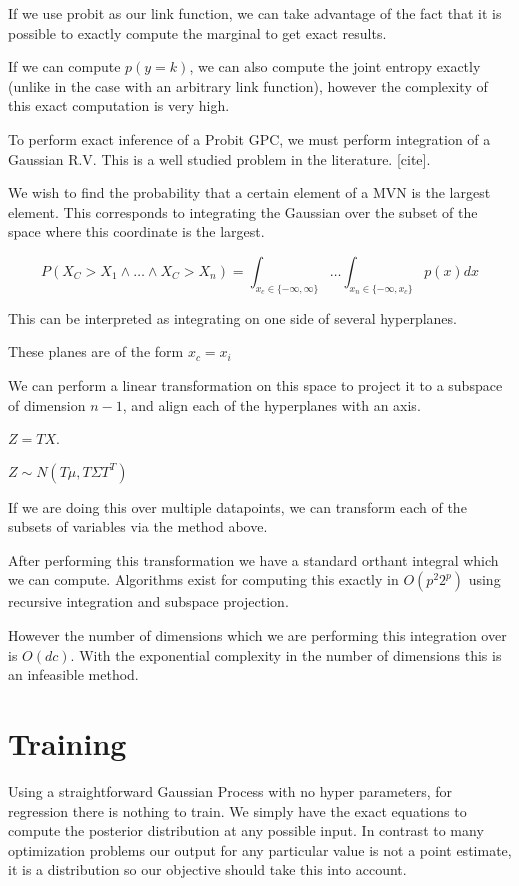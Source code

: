 \documentclass[12pt, a4paper]{report}
\theoremstyle{definition}
\theoremstyle{definition}
\theoremstyle{definition}
\begin{document}
If we use probit as our link function, we can take advantage of the fact that it is possible to exactly compute the marginal to get exact results.

If we can compute $p(y=k)$, we can also compute the joint entropy exactly (unlike in the case with an arbitrary link function), however the complexity of this exact computation is very high.



To perform exact inference of a Probit GPC, we must perform integration of a Gaussian R.V. This is a well studied problem in the literature. [cite].


We wish to find the probability that a certain element of a MVN is the largest element. This corresponds to integrating the Gaussian over the subset of the space where this coordinate is the largest.

$$P(X_C > X_1 \land \ldots \land X_C > X_n) = \int_{x_c \in \{ -\infty, \infty \} } \ldots \int_{x_n \in \{ -\infty , x_c \}} p(x) dx$$

This can be interpreted as integrating on one side of several hyperplanes.

These planes are of the form $x_c = x_i$

We can perform a linear transformation on this space to project it to a subspace of dimension $n-1$, and align each of the hyperplanes with an axis.

$Z = TX$.

$Z \sim N(T \mu, T \Sigma T^T)$


If we are doing this over multiple datapoints, we can transform each of the subsets of variables via the method above.

After performing this transformation we have a standard orthant integral which we can compute. Algorithms exist for computing this exactly in $O(p^2 2^p)$ using recursive integration and subspace projection. \cite{orthant}


However the number of dimensions which we are performing this integration over is $O(dc)$. With the exponential complexity in the number of dimensions this is an infeasible method.



\section{Training}

Using a straightforward Gaussian Process with no hyper parameters, for regression there is nothing to train. We simply have the exact equations to compute the posterior distribution at any possible input. In contrast to many optimization problems our output for any particular value is not a point estimate, it is a distribution so our objective should take this into account.
\end{document}
